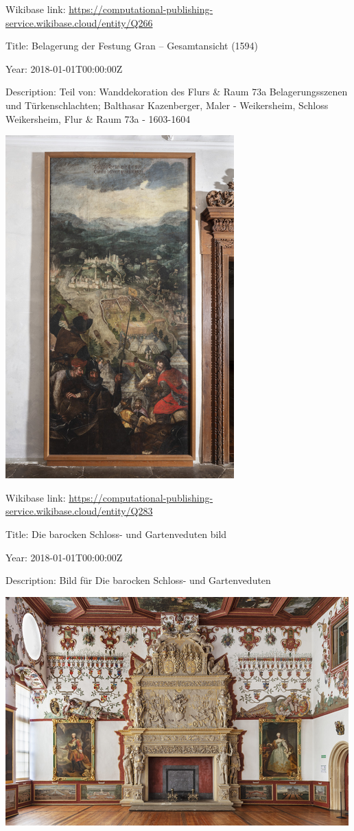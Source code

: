\documentclass[
  letterpaper,
]{book}
\begin{document}
Wikibase link:
\url{https://computational-publishing-service.wikibase.cloud/entity/Q266}

Title: Belagerung der Festung Gran -- Gesamtansicht (1594)

Year: 2018-01-01T00:00:00Z

Description: Teil von: Wanddekoration des Flurs \& Raum 73a
Belagerungsszenen und Türkenschlachten; Balthasar Kazenberger, Maler -
Weikersheim, Schloss Weikersheim, Flur \& Raum 73a - 1603-1604

\includegraphics{paintings_files/figure-pdf/cell-3-output-104.png}

Wikibase link:
\url{https://computational-publishing-service.wikibase.cloud/entity/Q283}

Title: Die barocken Schloss- und Gartenveduten bild

Year: 2018-01-01T00:00:00Z

Description: Bild für Die barocken Schloss- und Gartenveduten

\includegraphics{paintings_files/figure-pdf/cell-3-output-106.png}
\end{document}
